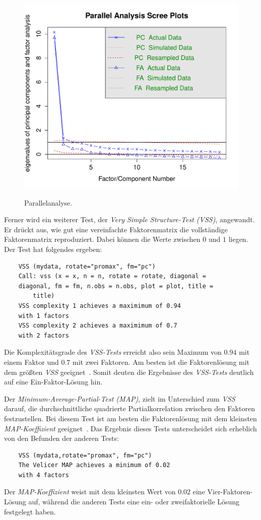 \documentclass[12pt,a4paper]{article}
\begin{document}
\begin{figure}[h]
\caption{Parallelanalyse.}
\centering
\includegraphics[scale=0.50]{../R-Berechnungen/Rplot02.pdf}
\label{fig_para}
\end{figure}

Ferner wird ein weiterer Test, der \textit{Very Simple Structure-Test (VSS)}, angewandt. Er drückt aus, wie gut eine vereinfachte Faktorenmatrix die vollständige Faktorenmatrix reproduziert. Dabei können die Werte zwischen $0$ und $1$ liegen. Der Test hat folgendes ergeben:
\begin{verbatim}
	VSS (mydata, rotate="promax", fm="pc")
	Call: vss (x = x, n = n, rotate = rotate, diagonal = 
	diagonal, fm = fm, n.obs = n.obs, plot = plot, title = 
		title)
	VSS complexity 1 achieves a maximimum of 0.94 
	with 1 factors
	VSS complexity 2 achieves a maximimum of 0.7 
	with 2 factors
	\end{verbatim}
\noindent Die Komplexitätsgrade des \textit{VSS-Tests} erreicht also sein Maximum von $0.94$ mit einem Faktor und $0.7$ mit zwei Faktoren. Am besten ist die Faktorenlösung mit dem größten \textit{VSS} geeignet~\parencite[S.~274]{Luhmann_2010}. Somit deuten die Ergebnisse des \textit{VSS-Tests} deutlich auf eine Ein-Faktor-Lösung hin.

	Der \textit{Minimum-Average-Partial-Test (MAP)}, zielt im Unterschied zum \textit{VSS} darauf, die durchschnittliche quadrierte Partialkorrelation zwischen den Faktoren festzustellen.  Bei diesem Test ist am besten die Faktorenlösung mit dem kleinsten \textit{MAP-Koeffizient} geeignet~\parencite[S.~274]{Luhmann_2010}. Das Ergebnis dieses Tests unterscheidet sich erheblich von den Befunden der anderen Tests:
	\begin{verbatim}
	VSS (mydata,rotate="promax", fm="pc")
	The Velicer MAP achieves a minimum of 0.02 
	with 4 factors
	\end{verbatim}
\noindent Der \textit{MAP-Koeffizient} weist mit dem kleinsten Wert von $0.02$ eine Vier-Faktoren-Lösung auf, während die anderen Tests eine ein- oder zweifaktorielle Lösung festgelegt haben.
\end{document}
